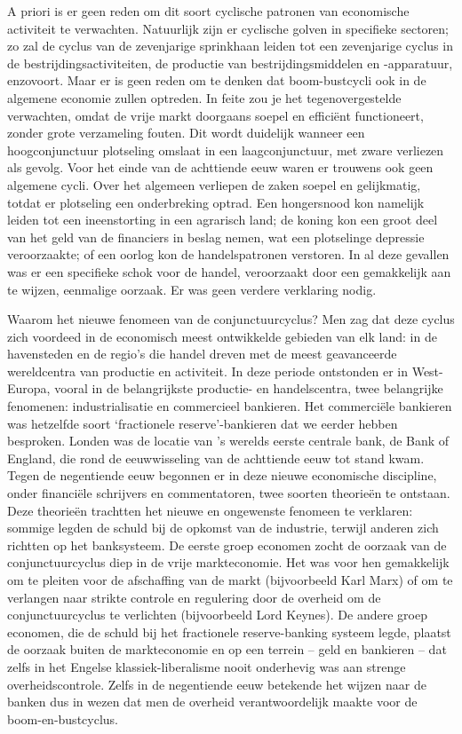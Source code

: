 \documentclass[
  a5paper,
  smalldemyvopaper,10pt,twoside,onecolumn,openright,extrafontsizes,hidelinks]{memoir}
\begin{document}
A priori is er geen reden om dit soort cyclische patronen van
economische activiteit te verwachten. Natuurlijk zijn er cyclische
golven in specifieke sectoren; zo zal de cyclus van de zevenjarige
sprinkhaan leiden tot een zevenjarige cyclus in de
bestrijdingsactiviteiten, de productie van bestrijdingsmiddelen en
-apparatuur, enzovoort. Maar er is geen reden om te denken dat
boom-bustcycli ook in de algemene economie zullen optreden. In feite zou
je het tegenovergestelde verwachten, omdat de vrije markt doorgaans
soepel en efficiënt functioneert, zonder grote verzameling fouten. Dit
wordt duidelijk wanneer een hoogconjunctuur plotseling omslaat in een
laagconjunctuur, met zware verliezen als gevolg. Voor het einde van de
achttiende eeuw waren er trouwens ook geen algemene cycli. Over het
algemeen verliepen de zaken soepel en gelijkmatig, totdat er plotseling
een onderbreking optrad. Een hongersnood kon namelijk leiden tot een
ineenstorting in een agrarisch land; de koning kon een groot deel van
het geld van de financiers in beslag nemen, wat een plotselinge
depressie veroorzaakte; of een oorlog kon de handelspatronen verstoren.
In al deze gevallen was er een specifieke schok voor de handel,
veroorzaakt door een gemakkelijk aan te wijzen, eenmalige oorzaak. Er
was geen verdere verklaring nodig.

Waarom het nieuwe fenomeen van de conjunctuurcyclus? Men zag dat deze
cyclus zich voordeed in de economisch meest ontwikkelde gebieden van elk
land: in de havensteden en de regio's die handel dreven met de meest
geavanceerde wereldcentra van productie en activiteit. In deze periode
ontstonden er in West-Europa, vooral in de belangrijkste productie- en
handelscentra, twee belangrijke fenomenen: industrialisatie en
commercieel bankieren. Het commerciële bankieren was hetzelfde soort
`fractionele reserve'-bankieren dat we eerder hebben besproken. Londen
was de locatie van 's werelds eerste centrale bank, de Bank of England,
die rond de eeuwwisseling van de achttiende eeuw tot stand kwam. Tegen
de negentiende eeuw begonnen er in deze nieuwe economische discipline,
onder financiële schrijvers en commentatoren, twee soorten theorieën te
ontstaan. Deze theorieën trachtten het nieuwe en ongewenste fenomeen te
verklaren: sommige legden de schuld bij de opkomst van de industrie,
terwijl anderen zich richtten op het banksysteem. De eerste groep
economen zocht de oorzaak van de conjunctuurcyclus diep in de vrije
markteconomie. Het was voor hen gemakkelijk om te pleiten voor de
afschaffing van de markt (bijvoorbeeld Karl Marx) of om te verlangen
naar strikte controle en regulering door de overheid om de
conjunctuurcyclus te verlichten (bijvoorbeeld Lord Keynes). De andere
groep economen, die de schuld bij het fractionele reserve-banking
systeem legde, plaatst de oorzaak buiten de markteconomie en op een
terrein -- geld en bankieren -- dat zelfs in het Engelse
klassiek-liberalisme nooit onderhevig was aan strenge overheidscontrole.
Zelfs in de negentiende eeuw betekende het wijzen naar de banken dus in
wezen dat men de overheid verantwoordelijk maakte voor de
boom-en-bustcyclus.
\end{document}
